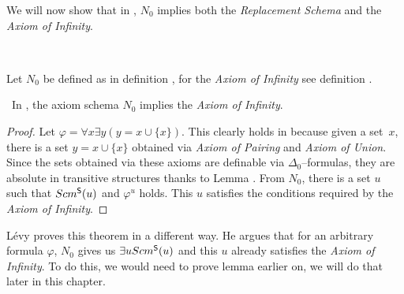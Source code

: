 We will now show that in , $N_0$ implies both the \emph{Replacement Schema} and the \emph{Axiom of Infinity}.

\

Let $N_0$ be defined as in definition , for the \emph{Axiom of Infinity} see definition .
\begin{theorem}\label{theorem:n0_implies_infinity}\
In , the axiom schema $N_0$ implies the \emph{Axiom of Infinity}.
\end{theorem}

\begin{proof} %
Let $\varphi = \forall x \exists y (y = x \cup \{x\})$. 
This clearly holds in  because given a set~$x$, there is a set $y = x \cup \{x\}$ obtained via \emph{Axiom of Pairing} and \emph{Axiom of Union}. Since the sets obtained via these axioms are definable via $\Delta_0$–formulas, they are absolute in transitive structures thanks to Lemma .
From $N_0$, there is a set $u$ such that $Scm^{\sf{S}}(u)$ and $\varphi^{u}$ holds. %
This $u$ satisfies the conditions required by the \emph{Axiom of Infinity}.
\end{proof}

Lévy proves this theorem in a different way. He argues that for an arbitrary formula $\varphi$, $N_0$ gives us $\exists u Scm^{\sf{S}}(u)$ and this $u$ already satisfies the \emph{Axiom of Infinity}. 
To do this, we would need to prove lemma \bref{lemma:scm_s_is_limit} earlier on, we will do that later in this chapter.

\

